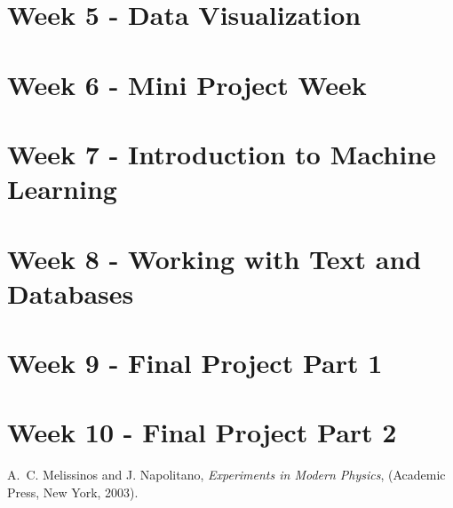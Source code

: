 \documentclass[letterpaper,12pt]{article}
\begin{document}
\section{Week 5 - Data Visualization
}


\section{Week 6 - Mini Project Week
}

\section{Week 7 - Introduction to Machine Learning
}
\section{Week 8 - Working with Text and Databases
}


\section{Week 9 - Final Project Part 1
}

\section{Week 10 - Final Project Part 2
}

\begin{thebibliography}{99}

A.~C. Melissinos and J. Napolitano, \textit{Experiments in Modern Physics},
(Academic Press, New York, 2003).


\end{thebibliography}
\end{document}
